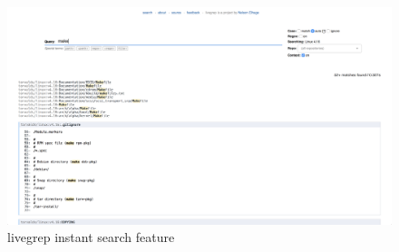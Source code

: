 \begin{itemize}
    \begin{figure}[htbp]
        \centering
        \includegraphics[width=145mm]{../img/livegrep.png}
        \caption{livegrep instant search feature}
        \label{livegrep}
    \end{figure}

\end{itemize}
